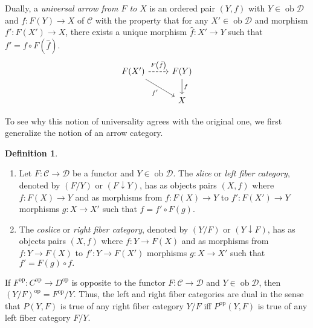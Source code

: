 \documentclass[10pt,letterpaper,cm]{nupset}
\theoremstyle{definition}
\newtheorem{definition}{Definition}[section]
\theoremstyle{theorem}
\theoremstyle{remark}
\newcommand{\1}{\mathbf{1}}
\renewcommand{\c}{\mathscr{C}}
\renewcommand{\d}{\mathscr{D}}
\newcommand{\0}{\vec 0}
\DeclareMathOperator{\op}{op}
\DeclareMathOperator{\ob}{ob}
\begin{document}
Dually, a \textit{universal arrow from $F$ to $X$} is an ordered pair $\left(Y, f\right)$ with $Y \in \ob \d$ and $f: F(Y) \to X$ of $\c$ with the property that for any $X' \in \ob \d$ and morphism $f' : F(X') \to X$, there exists a unique morphism $\hat{f}: X' \to Y$ such that $f' = f \circ F\left(\hat{f}\right)$.
\[ \begin{tikzcd}
F(X') \arrow[r, dashed, "F\left(\hat{f}\right)"] \arrow[swap, dr,  " f' "] & F(Y) \arrow[d, "f"] \\%
 & X
\end{tikzcd}
\]



To see why this notion of universality agrees with the original one, we first generalize the notion of an arrow category.

\begin{definition} $ $
\begin{enumerate}
\item Let $F: \c \to \d$ be a functor and $Y \in \ob \d$. The \textit{slice} or \textit{left fiber category}, denoted by $\left(F/Y\right)$ or $\left(F \downarrow Y\right)$, has as objects pairs $\left(X, f\right)$ where $f: F(X) \to Y$ and as morphisms from $f : F(X) \to Y$ to $f' : F(X') \to Y$ morphisms $g : X \to X'$ such that $f = f' \circ F(g).$ 
\item 
The \textit{coslice} or \textit{right fiber category}, denoted by $\left(Y/F\right)$ or $\left(Y \downarrow F\right)$, has as objects pairs $\left(X, f\right)$ where $f: Y\to F(X)$ and as morphisms from $f :  Y \to F(X)$ to $f' : Y \to F(X')$ morphisms $g : X \to X'$ such that $f' = F(g) \circ f.$
\end{enumerate}
\end{definition}



If $F^{\op}:C^{\op} \to D^{\op}$ is opposite to the functor $F: \c \to \d$ and $Y \in \ob \d$, then $\left(Y/F\right)^{\op} = {F^{\op}}/{Y}$. Thus, the left and right fiber categories are dual in the sense that $P(Y, F)$ is true of any right fiber category ${Y}/{F}$ iff $P^{\op}(Y, F)$ is true of any left fiber category ${F}/{Y}$. 

\smallskip
\end{document}
